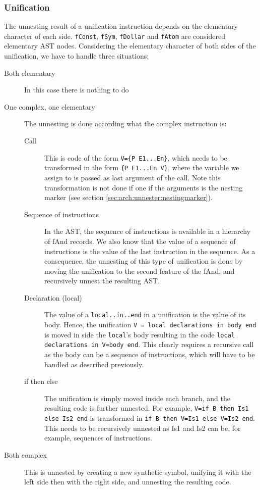 \documentclass[a4paper]{memoir}
\begin{document}
\subsubsection{Unification}\label{sec:arch:unnester:unification}
The unnesting result of a unification instruction depends on the elementary
character of each side. \lstinline!fConst!, \lstinline!fSym!,
\lstinline!fDollar! and \lstinline!fAtom! are considered elementary AST nodes.
Considering the elementary character of both sides of the unification, we have to handle three situations:
\begin{description}
  \item[Both elementary]In this case there is nothing to do
  \item[One complex, one elementary] The unnesting is done according what the complex instruction is: 
    \begin{description}
      \item[Call] This is code of the form \lstinline!V={P E1...En}!, which needs to be transformed in the form \lstinline!{P E1...En V}!, where the variable we assign to is passed as last argument of the call. Note this transformation is not done if one if the arguments is the nesting marker (see section \ref{sec:arch:unnester:nestingmarker}).
      \item[Sequence of instructions] In the AST, the sequence of instructions is available in a hierarchy of fAnd records. We also know that the value of a sequence of instructions is the value of the last instruction in the sequence. As a consequence, the unnesting of this type of unification is done by moving the unification to the second feature of the fAnd, and recursively unnest the resulting AST.
      \item[Declaration (local)] The value of a \lstinline!local..in..end! in a
        unification is the value of its body. Hence, the unification
        \lstinline!V = local declarations in body end! is moved in side the
        \lstinline!local!'s body resulting in the code \lstinline!local declarations in V=body end!. This clearly requires a recursive call as the body can be a sequence of instructions, which will have to be handled as described previously.
      \item[if then else] The unification is simply moved inside each branch, and the resulting code is further unnested. For example, \lstinline!V=if B then Is1 else Is2 end! is transformed in \lstinline!if B then V=Is1 else V=Is2 end!. This needs to be recursively unnested as Is1 and Is2 can be, for example,  sequences of instructions.
    \end{description}
  \item[Both complex] This is unnested by creating a new synthetic symbol, unifying it with the left side then with the right side, and unnesting the resulting code.
\end{description}
\end{document}
